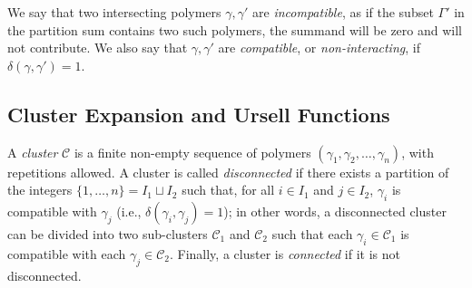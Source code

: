 We say that two intersecting polymers $\gamma, \gamma'$ are \emph{incompatible}, as if the subset $\Gamma'$ in the partition sum contains two such polymers, the summand will be zero and will not contribute. We also say that $\gamma, \gamma'$ are \emph{compatible}, or \emph{non-interacting}, if $\delta(\gamma, \gamma') = 1$. 


\subsection{Cluster Expansion and Ursell Functions}

A \textit{cluster} $\mathcal{C}$ is a finite non-empty sequence of polymers $(\gamma_1, \gamma_2, \dots, \gamma_n)$, with repetitions allowed. A cluster is called \emph{disconnected} if there exists a partition of the integers $\{1, \ldots , n \} = I_1 \sqcup I_2$ such that, for all $i \in I_1$ and $j \in I_2$, $\gamma_i$ is compatible with $\gamma_j$ (i.e., $\delta(\gamma_i, \gamma_j) = 1$); in other words, a disconnected cluster can be divided into two sub-clusters $\mathcal{C}_1$ and $\mathcal{C}_2$ such that each $\gamma_i \in \mathcal{C}_1$ is compatible with each $\gamma_j \in \mathcal{C}_2$. Finally, a cluster is \emph{connected} if it is not disconnected.


